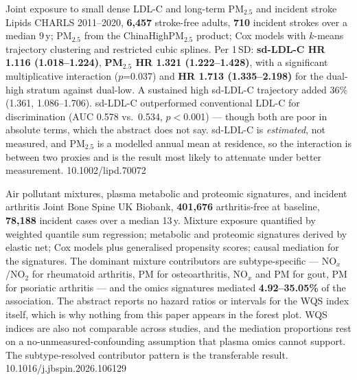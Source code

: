 \documentclass[10pt]{article}
\begin{document}
\clearpage


{Joint exposure to small dense LDL-C and long-term PM$_{2.5}$ and incident stroke}
{Lipids}
{CHARLS 2011--2020, \textbf{6{,}457} stroke-free adults, \textbf{710} incident strokes
over a median 9\,y; PM$_{2.5}$ from the ChinaHighPM$_{2.5}$ product; Cox models with
$k$-means trajectory clustering and restricted cubic splines. Per 1\,SD:
\textbf{sd-LDL-C HR 1.116 (1.018--1.224)}, \textbf{PM$_{2.5}$ HR 1.321 (1.222--1.428)},
with a significant multiplicative interaction ($p$=0.037) and \textbf{HR 1.713
(1.335--2.198)} for the dual-high stratum against dual-low. A sustained high sd-LDL-C
trajectory added 36\% (1.361, 1.086--1.706). sd-LDL-C outperformed conventional LDL-C for
discrimination (AUC 0.578 vs.\ 0.534, $p<$0.001) --- though both are poor in absolute
terms, which the abstract does not say. sd-LDL-C is \emph{estimated}, not measured, and
PM$_{2.5}$ is a modelled annual mean at residence, so the interaction is between two
proxies and is the result most likely to attenuate under better measurement.}
{10.1002/lipd.70072}


{Air pollutant mixtures, plasma metabolic and proteomic signatures, and incident arthritis}
{Joint Bone Spine}
{UK Biobank, \textbf{401{,}676} arthritis-free at baseline, \textbf{78{,}188} incident
cases over a median 13\,y. Mixture exposure quantified by weighted quantile sum
regression; metabolic and proteomic signatures derived by elastic net; Cox models plus
generalised propensity scores; causal mediation for the signatures. The dominant mixture
contributors are subtype-specific --- NO$_x$/NO$_2$ for rheumatoid arthritis, PM for
osteoarthritis, NO$_x$ and PM for gout, PM for psoriatic arthritis --- and the omics
signatures mediated \textbf{4.92--35.05\%} of the association. The abstract reports no
hazard ratios or intervals for the WQS index itself, which is why nothing from this paper
appears in the forest plot. WQS indices are also not comparable across studies, and the
mediation proportions rest on a no-unmeasured-confounding assumption that plasma omics
cannot support. The subtype-resolved contributor pattern is the transferable result.}
{10.1016/j.jbspin.2026.106129}

\end{document}

